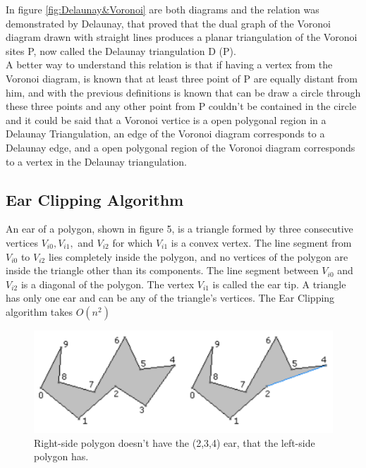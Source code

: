 \documentclass[conference]{IEEEtran}
\begin{document}
In figure \ref{fig:Delaunay&Voronoi} are both diagrams and the relation was demonstrated by Delaunay, that proved that the dual graph of the Voronoi diagram drawn with straight lines produces a planar triangulation of the Voronoi sites P, now called the Delaunay triangulation D (P).\cite{DelaunayTriangulation}\\
A better way to understand this relation is that if having a vertex from the Voronoi diagram, is known that at least three point of P are equally distant from him, and with the previous definitions is known that can be draw a circle through these three points and any other point from P couldn't be contained in the circle and it could be said that a Voronoi vertice is a open polygonal region in a Delaunay Triangulation, an edge of the Voronoi diagram corresponds to a Delaunay edge, and a open polygonal region of the Voronoi diagram corresponds to a vertex in the Delaunay triangulation.\cite{TriangulationsUnknown}
    
\subsection{Ear Clipping Algorithm}
An ear of a polygon, shown in figure 5, is a triangle formed by three consecutive vertices $V_{i0},V_{i1},$ and $V_{i2}$ for which $V_{i1}$ is a convex vertex. The line segment from $V_{i0}$ to $V_{i2}$ lies completely inside the polygon, and no vertices of the polygon are inside the triangle other than its components. The line segment between $V_{i0}$ and $V_{i2}$ is a diagonal of the polygon. The vertex $V_{i1}$ is called the ear tip. A triangle has only one ear and can be any of the triangle's vertices. The Ear Clipping algorithm takes $O(n^2)$\cite{EarClipping}
\begin{figure}
    \centering
    \includegraphics[scale=0.6]{triangleEar}
    \caption{Right-side polygon doesn't have the (2,3,4) ear, that the left-side polygon has.}
    \label{fig:earExample}
\end{figure}
\end{document}

